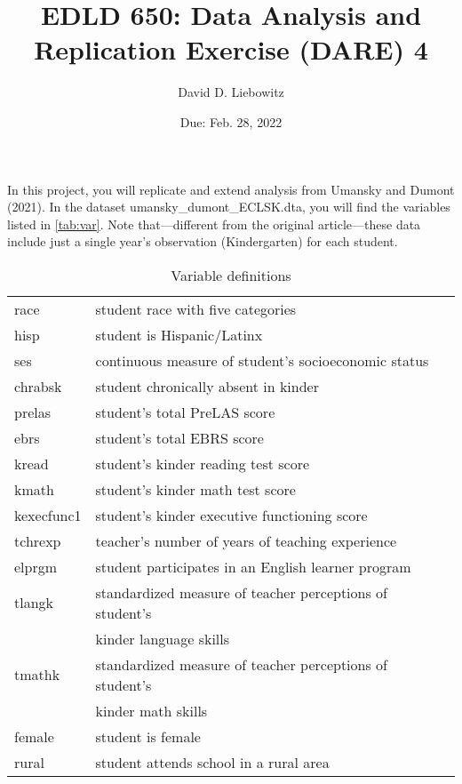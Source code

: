 \documentclass[a4paper, 11pt]{article}
\title{EDLD 650: Data Analysis and Replication Exercise (DARE) 4}
\author{David D. Liebowitz}
\date{Due: Feb. 28, 2022}
\begin{document}
\maketitle

In this project, you will replicate and extend analysis from Umansky and Dumont (2021). In the dataset umansky\_dumont\_ECLSK.dta, you will find the variables listed in \autoref{tab:var}. Note that---different from the original article---these data include just a single year's observation (Kindergarten) for each student.

\begin{table}[!htbp] \centering 
  \caption{Variable definitions} 

  \label{tab:var} 
\begin{tabular}{ll} 
\hline
\hline
race  &    student race with five categories \\
hisp & student is Hispanic/Latinx \\
ses      &    continuous measure of student's socioeconomic status \\
chrabsk &     student chronically absent in kinder \\
prelas      &   student's total PreLAS score \\
ebrs          & student's total EBRS score \\
kread         &   student's kinder reading test score \\
kmath           &  student's kinder math test score \\
kexecfunc1     &   student's kinder executive functioning score \\
tchrexp         & teacher's number of years of teaching experience \\
elprgm      & student participates in an English learner program \\
tlangk        &     standardized measure of teacher perceptions of student's \\
&				 kinder language skills \\
tmathk        &  standardized measure of teacher perceptions of student's \\
&				kinder math skills \\
female       &student is female \\
rural          & student attends school in a rural area \\

\hline
\hline

\end{tabular}
\end{table}
\end{document}
